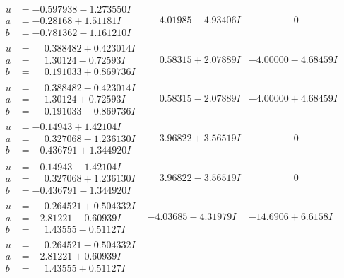 \documentclass[1p]{elsarticle_modified}
\theoremstyle{definition}
\begin{document}
$$\begin{array}{c|c|c}
\begin{aligned}
u &= -0.597938 - 1.273550 I \\
a &= -0.28168 + 1.51181 I \\
b &= -0.781362 - 1.161210 I\end{aligned}
 & \phantom{-}4.01985 - 4.93406 I & \phantom{-0.000000 } 0 \\ \hline\begin{aligned}
u &= \phantom{-}0.388482 + 0.423014 I \\
a &= \phantom{-}1.30124 - 0.72593 I \\
b &= \phantom{-}0.191033 + 0.869736 I\end{aligned}
 & \phantom{-}0.58315 + 2.07889 I & -4.00000 - 4.68459 I \\ \hline\begin{aligned}
u &= \phantom{-}0.388482 - 0.423014 I \\
a &= \phantom{-}1.30124 + 0.72593 I \\
b &= \phantom{-}0.191033 - 0.869736 I\end{aligned}
 & \phantom{-}0.58315 - 2.07889 I & -4.00000 + 4.68459 I \\ \hline\begin{aligned}
u &= -0.14943 + 1.42104 I \\
a &= \phantom{-}0.327068 - 1.236130 I \\
b &= -0.436791 + 1.344920 I\end{aligned}
 & \phantom{-}3.96822 + 3.56519 I & \phantom{-0.000000 } 0 \\ \hline\begin{aligned}
u &= -0.14943 - 1.42104 I \\
a &= \phantom{-}0.327068 + 1.236130 I \\
b &= -0.436791 - 1.344920 I\end{aligned}
 & \phantom{-}3.96822 - 3.56519 I & \phantom{-0.000000 } 0 \\ \hline\begin{aligned}
u &= \phantom{-}0.264521 + 0.504332 I \\
a &= -2.81221 - 0.60939 I \\
b &= \phantom{-}1.43555 - 0.51127 I\end{aligned}
 & -4.03685 - 4.31979 I & -14.6906 + 6.6158 I \\ \hline\begin{aligned}
u &= \phantom{-}0.264521 - 0.504332 I \\
a &= -2.81221 + 0.60939 I \\
b &= \phantom{-}1.43555 + 0.51127 I\end{aligned}

\end{array}$$
\end{document}
